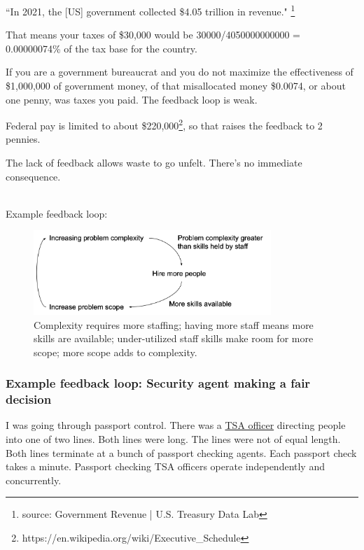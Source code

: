 ``In 2021, the [US] government collected \$4.05 trillion in revenue."
\footnote{source: Government Revenue | U.S. Treasury Data Lab}

That means your taxes of \$30,000 would be
30000/4050000000000 = 0.00000074\% of the tax base for the country.

If you are a government bureaucrat and you do not maximize the effectiveness of \$1,000,000 of government money, of that misallocated money \$0.0074, or about one penny, was taxes you paid. The feedback loop is weak.

Federal pay is limited to about \$220,000\footnote{https://en.wikipedia.org/wiki/Executive\_Schedule}, so that raises the feedback to 2 pennies.

The lack of feedback allows waste to go unfelt. There's no immediate consequence.

\ \\

Example feedback loop:
\begin{center}
\begin{figure}[ht]
    \centering
    \includegraphics[width=0.8\textwidth]{images/feedback_loop_complexity_and_staffing}
    \caption{Complexity requires more staffing; having more staff means more skills are available; under-utilized staff skills make room for more scope; more scope adds to complexity.}
    \label{fig:complexity_and_staff_growth}
\end{figure}
\end{center}

\subsubsection{Example feedback loop: Security agent making a fair decision}
I was going through passport control. 
There was a \href{https://en.wikipedia.org/wiki/Transportation_Security_Administration}{TSA officer} directing people into one of two lines. Both lines were long. The lines were not of equal length. Both lines terminate at a bunch of passport checking agents. Each passport check takes a minute. Passport checking TSA officers operate independently and concurrently.


